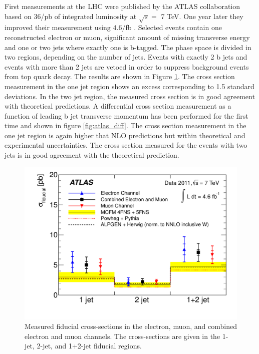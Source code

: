 	First measurements at the LHC were published by the ATLAS collaboration based on 36/pb of integrated luminosity at $\sqrt{s} =$ 7 TeV. One year later they improved their measurement using $4.6/$fb \cite{Aad:2013vka}. Selected events contain one reconstructed electron or muon, significant amount of missing transverse energy and one or two jets where exactly one is b-tagged. The phase space is divided in two regions, depending on the number of jets. Events with exactly 2 b jets and events with more than 2 jets are vetoed in order to suppress background events from top quark decay. The results are shown in Figure \ref{fig:atlas_tot}. The cross section measurement in the one jet region shows an excess corresponding to 1.5 standard deviations. In the two jet region, the measured cross section is in good agreement with theoretical predictions. A differential cross section measurement as a function of leading b jet transverse momentum has been performed for the first time and shown in figure \ref{fig:atlas_diff}. The cross section measurement in the one jet region is again higher that NLO predictions but within theoretical and experimental uncertainties. The cross section measured for the events with two jets is in good agreement with the theoretical prediction.
\begin{figure}[htbp]
	\centering
		\includegraphics[width=0.7\linewidth]{Figures/atlas_total.pdf}
	\caption[Atlas Wbb total cross section measurement]{Measured fiducial cross-sections in the electron, muon, and combined electron and muon channels. The cross-sections are given in the 1-jet, 2-jet, and 1+2-jet fiducial regions.\cite{Aad:2013vka} }
	\label{fig:atlas_tot}
\end{figure}
